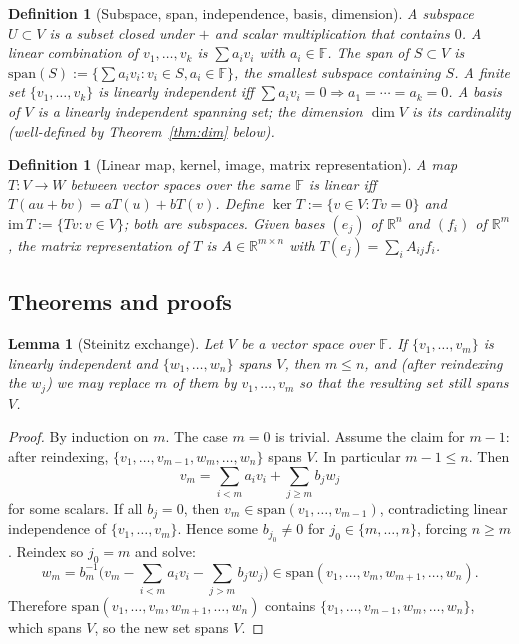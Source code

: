 \documentclass[11pt]{article}
\newtheorem{definition}[theorem]{Definition}
\newtheorem{lemma}[theorem]{Lemma}
\theoremstyle{remark}
\begin{document}
\begin{definition}[Subspace, span, independence, basis, dimension]
A \emph{subspace} $U\subset V$ is a subset closed under $+$ and scalar multiplication that contains $0$. A \emph{linear combination} of $v_1,\dots,v_k$ is $\sum a_i v_i$ with $a_i\in\mathbb{F}$. The \emph{span} of $S\subset V$ is $\mathrm{span}(S) := \{\sum a_iv_i : v_i\in S, a_i\in\mathbb{F}\}$, the smallest subspace containing $S$. A finite set $\{v_1,\dots,v_k\}$ is \emph{linearly independent} iff $\sum a_i v_i = 0 \Rightarrow a_1=\cdots=a_k=0$. A \emph{basis} of $V$ is a linearly independent spanning set; the \emph{dimension} $\dim V$ is its cardinality (well-defined by Theorem~\ref{thm:dim} below).
\end{definition}

\begin{definition}[Linear map, kernel, image, matrix representation]
A map $T\colon V\to W$ between vector spaces over the same $\mathbb{F}$ is \emph{linear} iff $T(au+bv) = aT(u)+bT(v)$. Define $\ker T := \{v\in V: Tv = 0\}$ and $\mathrm{im}\,T := \{Tv : v\in V\}$; both are subspaces. Given bases $(e_j)$ of $\mathbb{R}^n$ and $(f_i)$ of $\mathbb{R}^m$, the \emph{matrix representation} of $T$ is $A\in\mathbb{R}^{m\times n}$ with $T(e_j) = \sum_i A_{ij} f_i$.
\end{definition}

\subsection*{Theorems and proofs}

\begin{lemma}[Steinitz exchange]\label{lem:steinitz}
Let $V$ be a vector space over $\mathbb{F}$. If $\{v_1,\dots,v_m\}$ is linearly independent and $\{w_1,\dots,w_n\}$ spans $V$, then $m\le n$, and (after reindexing the $w_j$) we may replace $m$ of them by $v_1,\dots,v_m$ so that the resulting set still spans $V$.
\end{lemma}

\begin{proof}
By induction on $m$. The case $m=0$ is trivial. Assume the claim for $m-1$: after reindexing, $\{v_1,\dots,v_{m-1},w_m,\dots,w_n\}$ spans $V$. In particular $m-1\le n$. Then
\[
v_m = \sum_{i<m} a_i v_i + \sum_{j\ge m} b_j w_j
\]
for some scalars. If all $b_j = 0$, then $v_m\in\mathrm{span}(v_1,\dots,v_{m-1})$, contradicting linear independence of $\{v_1,\dots,v_m\}$. Hence some $b_{j_0}\ne 0$ for $j_0\in\{m,\dots,n\}$, forcing $n\ge m$. Reindex so $j_0=m$ and solve:
\[
w_m = b_m^{-1}\!\Big(v_m - \sum_{i<m} a_i v_i - \sum_{j>m} b_j w_j\Big) \in \mathrm{span}(v_1,\dots,v_m,w_{m+1},\dots,w_n).
\]
Therefore $\mathrm{span}(v_1,\dots,v_m,w_{m+1},\dots,w_n)$ contains $\{v_1,\dots,v_{m-1},w_m,\dots,w_n\}$, which spans $V$, so the new set spans $V$.
\end{proof}
\end{document}
